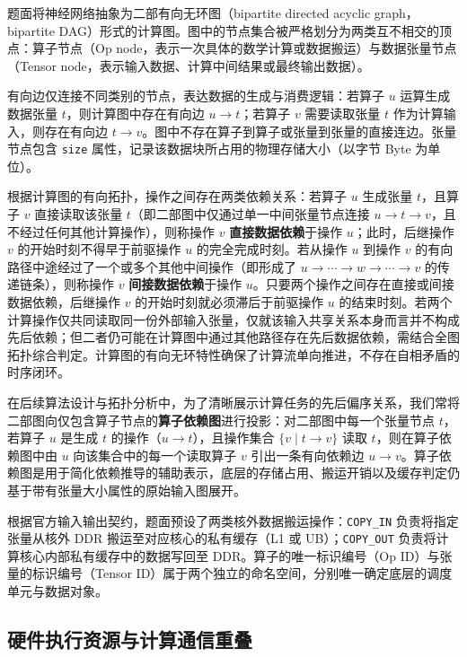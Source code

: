 \documentclass[anonymous,withtoc]{gmcm2026}
\begin{document}
题面将神经网络抽象为二部有向无环图（bipartite directed acyclic graph，bipartite DAG）形式的计算图。图中的节点集合被严格划分为两类互不相交的顶点：算子节点（Op node，表示一次具体的数学计算或数据搬运）与数据张量节点（Tensor node，表示输入数据、计算中间结果或最终输出数据）。

有向边仅连接不同类别的节点，表达数据的生成与消费逻辑：若算子 \(u\) 运算生成数据张量 \(t\)，则计算图中存在有向边 \(u \to t\)；若算子 \(v\) 需要读取张量 \(t\) 作为计算输入，则存在有向边 \(t \to v\)。图中不存在算子到算子或张量到张量的直接连边。张量节点包含 \texttt{size} 属性，记录该数据块所占用的物理存储大小（以字节 Byte 为单位）。

根据计算图的有向拓扑，操作之间存在两类依赖关系：若算子 \(u\) 生成张量 \(t\)，且算子 \(v\) 直接读取该张量 \(t\)（即二部图中仅通过单一中间张量节点连接 \(u \to t \to v\)，且不经过任何其他计算操作），则称操作 \(v\) \textbf{直接数据依赖}于操作 \(u\)；此时，后继操作 \(v\) 的开始时刻不得早于前驱操作 \(u\) 的完全完成时刻。若从操作 \(u\) 到操作 \(v\) 的有向路径中途经过了一个或多个其他中间操作（即形成了 \(u \to \cdots \to w \to \cdots \to v\) 的传递链条），则称操作 \(v\) \textbf{间接数据依赖}于操作 \(u\)。只要两个操作之间存在直接或间接数据依赖，后继操作 \(v\) 的开始时刻就必须滞后于前驱操作 \(u\) 的结束时刻。若两个计算操作仅共同读取同一份外部输入张量，仅就该输入共享关系本身而言并不构成先后依赖；但二者仍可能在计算图中通过其他路径存在先后数据依赖，需结合全图拓扑综合判定。计算图的有向无环特性确保了计算流单向推进，不存在自相矛盾的时序闭环。

在后续算法设计与拓扑分析中，为了清晰展示计算任务的先后偏序关系，我们常将二部图向仅包含算子节点的\textbf{算子依赖图}进行投影：对二部图中每一个张量节点 \(t\)，若算子 \(u\) 是生成 \(t\) 的操作（\(u \to t\)），且操作集合 \(\{v \mid t \to v\}\) 读取 \(t\)，则在算子依赖图中由 \(u\) 向该集合中的每一个读取算子 \(v\) 引出一条有向依赖边 \(u \to v\)。算子依赖图是用于简化依赖推导的辅助表示，底层的存储占用、搬运开销以及缓存判定仍基于带有张量大小属性的原始输入图展开。

根据官方输入输出契约，题面预设了两类核外数据搬运操作：\texttt{COPY\_IN} 负责将指定张量从核外 DDR 搬运至对应核心的私有缓存（L1 或 UB）；\texttt{COPY\_OUT} 负责将计算核心内部私有缓存中的数据写回至 DDR。算子的唯一标识编号（Op ID）与张量的标识编号（Tensor ID）属于两个独立的命名空间，分别唯一确定底层的调度单元与数据对象。

\subsection{硬件执行资源与计算通信重叠}
\end{document}
